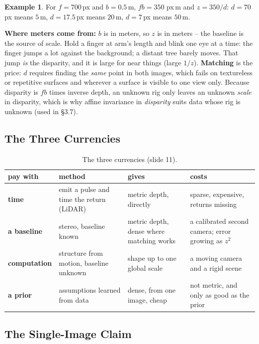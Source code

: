 \documentclass[11pt,a4paper]{article}
\theoremstyle{definition}
\newtheorem{example}[definition]{Example}
\theoremstyle{plain}
\theoremstyle{remark}
\begin{document}
\begin{example}
For $f=700$\,px and $b=0.5$\,m, $fb=350$ px\,m and $z=350/d$: $d=70$\,px means $5$\,m, $d=17.5$\,px means $20$\,m, $d=7$\,px means $50$\,m.
\end{example}
 
\begin{intuition}
\textbf{Where meters come from:} $b$ is in meters, so $z$ is in meters -- the baseline is the source of scale. Hold a finger at arm's length and blink one eye at a time: the finger jumps a lot against the background; a distant tree barely moves. That jump \emph{is} the disparity, and it is large for near things (large $1/z$). \textbf{Matching} is the price: $d$ requires finding the \emph{same} point in both images, which fails on textureless or repetitive surfaces and wherever a surface is visible to one view only. Because disparity is $fb$ times inverse depth, an unknown rig only leaves an unknown \emph{scale} in disparity, which is why affine invariance in \emph{disparity} suits data whose rig is unknown (used in \S3.7).
\end{intuition}
 
\subsection{The Three Currencies }
 
\begin{table}[htbp]
\centering\small
\begin{tabularx}{\linewidth}{@{}p{2.2cm}YYY@{}}
\toprule
pay with & method & gives & costs\\
\midrule
\textbf{time} & emit a pulse and time the return (LiDAR) & metric depth, directly & sparse, expensive, returns missing\\
\textbf{a baseline} & stereo, baseline known & metric depth, dense where matching works & a calibrated second camera; error growing as $z^2$\\
\textbf{computation} & structure from motion, baseline unknown & shape up to one global scale & a moving camera and a rigid scene\\
\textbf{a prior} & assumptions learned from data & dense, from one image, cheap & not metric, and only as good as the prior\\
\bottomrule
\end{tabularx}
\caption{The three currencies (slide 11).}
\end{table}
 
\subsection{The Single-Image Claim }
 
\end{document}
